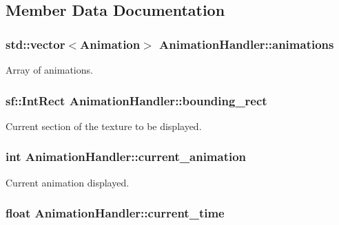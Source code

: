 \subsection{Member Data Documentation}
\hypertarget{class_animation_handler_ab04e2b457325095c264dba4a067690cd}{
\subsubsection[{animations}]{\setlength{\rightskip}{0pt plus 5cm}std\+::vector$<${\bf Animation}$>$ Animation\+Handler\+::animations\hspace{0.3cm}{\ttfamily [private]}}}\label{class_animation_handler_ab04e2b457325095c264dba4a067690cd}


Array of animations. 

\hypertarget{class_animation_handler_ae38964052ccbdd44d92c8d23eb0b880d}{
\subsubsection[{bounding\+\_\+rect}]{\setlength{\rightskip}{0pt plus 5cm}sf\+::\+Int\+Rect Animation\+Handler\+::bounding\+\_\+rect}}\label{class_animation_handler_ae38964052ccbdd44d92c8d23eb0b880d}


Current section of the texture to be displayed. 

\hypertarget{class_animation_handler_ad03db9fa9c9589a72b438033b283a9cb}{
\subsubsection[{current\+\_\+animation}]{\setlength{\rightskip}{0pt plus 5cm}int Animation\+Handler\+::current\+\_\+animation\hspace{0.3cm}{\ttfamily [private]}}}\label{class_animation_handler_ad03db9fa9c9589a72b438033b283a9cb}


Current animation displayed. 

\hypertarget{class_animation_handler_a91dd0c9aeb1b824a2ddef6b6867a0245}{
\subsubsection[{current\+\_\+time}]{\setlength{\rightskip}{0pt plus 5cm}float Animation\+Handler\+::current\+\_\+time\hspace{0.3cm}{\ttfamily [private]}}}\label{class_animation_handler_a91dd0c9aeb1b824a2ddef6b6867a0245}


